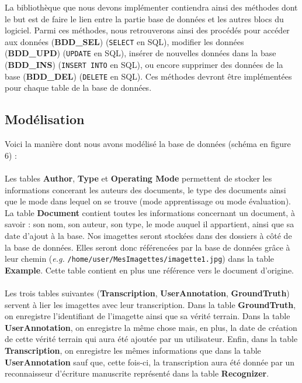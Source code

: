 La bibliothèque que nous devons implémenter contiendra ainsi des méthodes dont
le but est de faire le lien entre la partie base de données et les autres
blocs du logiciel. Parmi ces méthodes, nous retrouverons ainsi des procédés
pour accéder aux données (\textbf{BDD\_SEL}) (\texttt{SELECT} en SQL),
modifier les données (\textbf{BDD\_UPD}) (\texttt{UPDATE} en SQL), insérer de
nouvelles données dans la base (\textbf{BDD\_INS}) (\texttt{INSERT INTO} en
SQL), ou encore supprimer des données de la base (\textbf{BDD\_DEL})
(\texttt{DELETE} en SQL). Ces méthodes devront être implémentées pour chaque
table de la base de données.

\subsection{Modélisation}

Voici la manière dont nous avons modélisé la base de données (schéma en figure
6) :

\paragraph{}
Les tables \textbf{Author}, \textbf{Type} et \textbf{Operating Mode} permettent
de stocker les informations concerant les auteurs des documents, le type des
documents ainsi que le mode dans lequel on se trouve (mode apprentissage ou
mode évaluation). La table \textbf{Document} contient toutes les informations
concernant un document, à savoir : son nom, son auteur, son type, le mode auquel
il appartient, ainsi que sa date d’ajout à la base.
Nos imagettes seront stockées dans des dossiers à côté de la base de données.
Elles seront donc référencées par la base de données grâce à leur chemin
(\textit{e.g.} \texttt{/home/user/MesImagettes/imagette1.jpg}) dans la table
\textbf{Example}. Cette table contient en plus une référence vers le document
d’origine.

\paragraph{}
Les trois tables suivantes (\textbf{Transcription}, \textbf{UserAnnotation},
\textbf{GroundTruth}) servent à lier les imagettes avec leur transcription.
Dans la table \textbf{GroundTruth}, on enregistre l’identifiant de l’imagette
ainsi que sa vérité terrain. Dans la table \textbf{UserAnnotation}, on
enregistre la même chose mais, en plus, la date de création de cette vérité
terrain qui aura été ajoutée par un utilisateur. Enfin, dans la table
\textbf{Transcription}, on enregistre les mêmes informations que dans la
table \textbf{UserAnnotation} sauf que, cette fois-ci, la transcription aura
été donnée par un reconnaisseur d’écriture manuscrite représenté dans la
table \textbf{Recognizer}.

